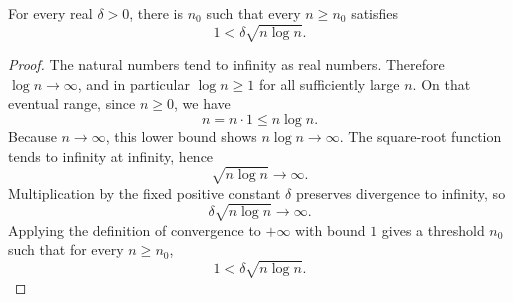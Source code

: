 \begin{lemma}
For every real \(\delta>0\), there is \(n_0\) such that every \(n\ge n_0\)
satisfies
\[
1<\delta\sqrt{n\log n}.
\]
\end{lemma}
\begin{proof}
The natural numbers tend to infinity as real numbers.  Therefore
\(\log n\to\infty\), and in particular \(\log n\ge 1\) for all sufficiently
large \(n\).  On that eventual range, since \(n\ge0\), we have
\[
n=n\cdot 1\le n\log n.
\]
Because \(n\to\infty\), this lower bound shows \(n\log n\to\infty\).  The
square-root function tends to infinity at infinity, hence
\[
\sqrt{n\log n}\to\infty.
\]
Multiplication by the fixed positive constant \(\delta\) preserves divergence
to infinity, so
\[
\delta\sqrt{n\log n}\to\infty.
\]
Applying the definition of convergence to \(+\infty\) with bound \(1\) gives a
threshold \(n_0\) such that for every \(n\ge n_0\),
\[
1<\delta\sqrt{n\log n}.
\]
\end{proof}
